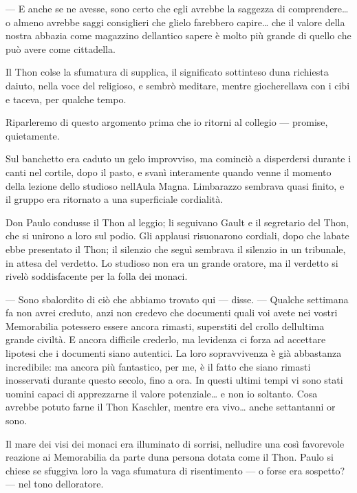 --- E anche se ne avesse, sono certo che egli avrebbe la saggezza di
comprendere\ldots{} o almeno avrebbe saggi consiglieri che glielo
farebbero capire\ldots{} che il valore della nostra abbazia come
magazzino dell\textquotesingle antico sapere è molto più grande di
quello che può avere come cittadella.

Il Thon colse la sfumatura di supplica, il significato sottinteso
d\textquotesingle una richiesta d\textquotesingle aiuto, nella voce del
religioso, e sembrò meditare, mentre giocherellava con i cibi e taceva,
per qualche tempo.

Riparleremo di questo argomento prima che io ritorni al collegio ---
promise, quietamente.

Sul banchetto era caduto un gelo improvviso, ma cominciò a disperdersi
durante i canti nel cortile, dopo il pasto, e svanì interamente quando
venne il momento della lezione dello studioso nell\textquotesingle Aula
Magna. L\textquotesingle imbarazzo sembrava quasi finito, e il gruppo
era ritornato a una superficiale cordialità.

Don Paulo condusse il Thon al leggio; li seguivano Gault e il segretario
del Thon, che si unirono a loro sul podio. Gli applausi risuonarono
cordiali, dopo che l\textquotesingle abate ebbe presentato il Thon; il
silenzio che seguì sembrava il silenzio in un tribunale, in attesa del
verdetto. Lo studioso non era un grande oratore, ma il verdetto si
rivelò soddisfacente per la folla dei monaci.

--- Sono sbalordito di ciò che abbiamo trovato qui --- disse. ---
Qualche settimana fa non avrei creduto, anzi non credevo che documenti
quali voi avete nei vostri Memorabilia potessero essere ancora rimasti,
superstiti del crollo dell\textquotesingle ultima grande civiltà. E
ancora difficile crederlo, ma l\textquotesingle evidenza ci forza ad
accettare l\textquotesingle ipotesi che i documenti siano autentici. La
loro sopravvivenza è già abbastanza incredibile: ma ancora più
fantastico, per me, è il fatto che siano rimasti inosservati durante
questo secolo, fino a ora. In questi ultimi tempi vi sono stati uomini
capaci di apprezzarne il valore potenziale\ldots{} e non io soltanto.
Cosa avrebbe potuto farne il Thon Kaschler, mentre era vivo\ldots{}
anche settant\textquotesingle anni or sono.

Il mare dei visi dei monaci era illuminato di sorrisi,
nell\textquotesingle udire una così favorevole reazione ai Memorabilia
da parte d\textquotesingle una persona dotata come il Thon. Paulo si
chiese se sfuggiva loro la vaga sfumatura di risentimento --- o forse
era sospetto? --- nel tono dell\textquotesingle oratore.

